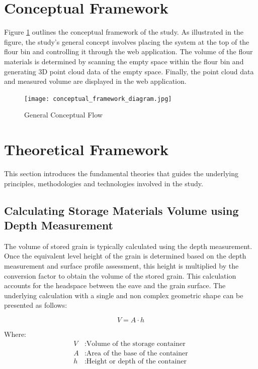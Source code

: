 \section{Conceptual Framework}
\label{intro:sec:Conceptual Framework}

Figure \ref{intro:sec:Conceptual Framework} outlines the conceptual framework of the study. As illustrated in the figure, the study's general concept involves placing the system at the top of the flour bin and controlling it through the web application. The volume of the flour materials is determined by scanning the empty space within the flour bin and generating 3D point cloud data of the empty space. Finally, the point cloud data and measured volume are displayed in the web application.

\begin{figure}[H]
	\centering
	\texttt{[image: conceptual\_framework\_diagram.jpg]}
	\caption{General Conceptual Flow}
	\label{fig:conceptual-framework}
\end{figure}

\section{Theoretical Framework}
\label{intro:sec:Theoretical Framework}
This section introduces the fundamental theories that guides the underlying principles, methodologies and technologies involved in the study.

\subsection{Calculating Storage Materials Volume using Depth Measurement}
The volume of stored grain is typically calculated using the depth measurement. Once the equivalent level height of the grain is determined based on the depth measurement and surface profile assessment, this height is multiplied by the conversion factor to obtain the volume of the stored grain. This calculation accounts for the headspace between the eave and the grain surface. The underlying calculation with a single and non complex geometric shape can be presented as follows:

\begin{equation}
	V = A \cdot h
\end{equation}

Where:
\begin{align*}
	V & : \text{Volume of the storage container}   \\
	A & : \text{Area of the base of the container} \\
	h & : \text{Height or depth of the container}
\end{align*}

